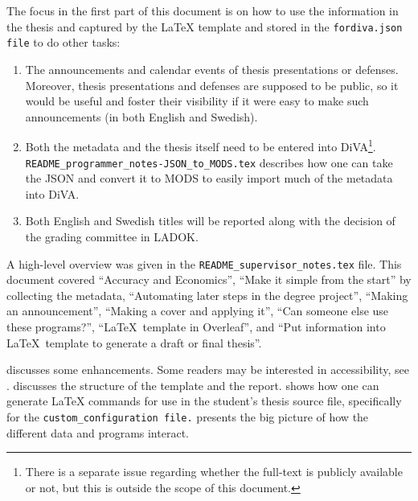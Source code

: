 \documentclass[12pt, twoside]{article}
\newcommand{\fname}[1]{\texttt{#1}}
\begin{document}
The focus in the first part of this document is on how to use the information in the thesis and captured by the \LaTeX{}  template and stored in the \fname{fordiva.json file} to do other tasks:
\begin{enumerate}
    \item The announcements and calendar events of thesis presentations or defenses. Moreover, thesis presentations and defenses are supposed to be public, so it would be useful and foster their visibility if it were easy to make such announcements (in both English and Swedish).
    
    \item Both the metadata and the thesis itself need to be entered into \foreignlanguage{swedish}{\gls{DiVA}}\footnote{There is a separate issue regarding whether the full-text is publicly available or not, but this is outside the scope of this document.}. \fname{README\_programmer\_notes-JSON\_to\_MODS.tex} describes how one can take the \gls{JSON} and convert it to \gls{MODS} to easily import much of the metadata into \gls{DiVA}.
    
    \item Both English and Swedish titles will be reported along with the decision of the grading committee in \foreignlanguage{swedish}{\gls{LADOK}}.
\end{enumerate}


A high-level overview was given in the \fname{README\_supervisor\_notes.tex} file. This document covered \enquote{Accuracy and Economics}, \enquote{Make it simple from the start} by collecting the metadata, 
\enquote{Automating later steps in the degree project},
\enquote{Making an announcement},
\enquote{Making a cover and applying it},
\enquote{Can someone else use these programs?},
\enquote{\LaTeX{}~template in Overleaf}, and
\enquote{Put information into \LaTeX{}~template to generate a draft or final thesis}.

 discusses some enhancements. Some readers may be interested in accessibility, see .  discusses the structure of the template and the report. 
 shows how one can generate \LaTeX{}  commands for use in the student’s thesis source file, specifically for the \texttt{custom\_configuration file.}
 presents the big picture of how the different data and programs interact.
\end{document}
